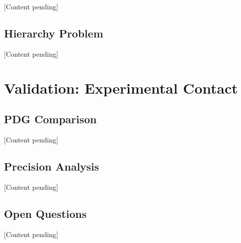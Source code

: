 \documentclass[11pt,a4paper]{book}
\begin{document}
[Content pending]

\chapter{Hierarchy Problem}

[Content pending]


\part{Validation: Experimental Contact}

\chapter{PDG Comparison}

[Content pending]

\chapter{Precision Analysis}

[Content pending]

\chapter{Open Questions}

[Content pending]
\end{document}
